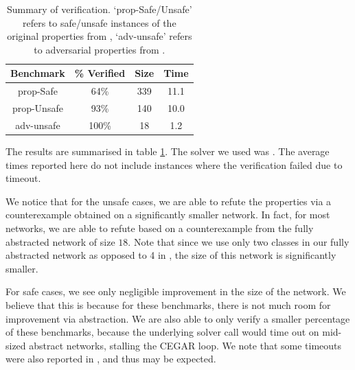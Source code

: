 \begin{table}
\begin{tabular}{ |c|c|c|c| }
\hline
Benchmark   & \% Verified & Size     & Time \\ 
\hline
prop-Safe   &   64\%      & 339      & 11.1  \\
prop-Unsafe &   93\%      & 140      & 10.0  \\
adv-unsafe  &  100\%      & 18       & 1.2   \\
\hline                                                                
\end{tabular}
\caption{Summary of \acasxu verification. `prop-Safe/Unsafe' refers to
safe/unsafe instances of the original properties from \cite{reluplex},
`adv-unsafe' refers to adversarial properties from \cite{cegar-nn}. }
\label{t:acas-verif}
\end{table}

The results are summarised in table \ref{t:acas-verif}. The solver we used was
\abcrown. The average times reported here do not include instances where the
verification failed due to timeout.

We notice that for the unsafe cases, we are able to refute the
properties via a counterexample obtained on a significantly smaller network. In
fact, for most networks, we are able to refute based on a counterexample from
the fully abstracted network of size $18$. Note that since we use only two classes in our
fully abstracted network as opposed to 4 in \cite{cegar-nn}, the size of this
network is significantly smaller. 

For safe cases, we see only negligible improvement in the size of the network.
We believe that this is because for these benchmarks, there is not much room for
improvement via abstraction. We are also able to only verify a smaller
percentage of these benchmarks, because the underlying solver call would time
out on mid-sized abstract networks, stalling
the CEGAR loop. We note that some timeouts were also reported in
\cite{cegar-nn}, and thus may be expected.

